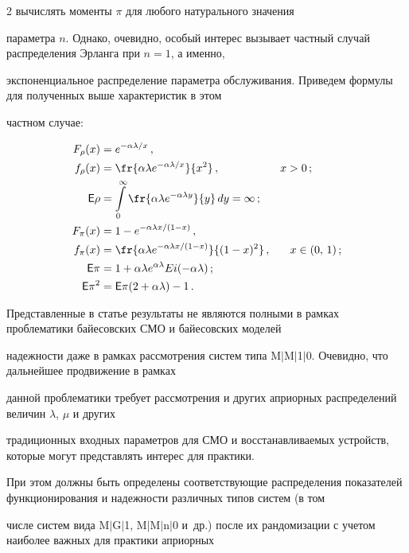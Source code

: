 \begin{multicols}{2}
вычис\-лять моменты $\pi$ для любого натурального значения


параметра $n$. Однако, очевидно, особый интерес вызывает частный случай распределения Эрланга при $n=1$, а именно,


экспоненциальное распределение параметра обслуживания. Приведем формулы для полученных выше характеристик в этом


частном случае:


\begin{align*}


F_\rho(x)&=e^{-\alpha\lambda /x}\,, \\ 


f_\rho(x)&=\fr{\alpha\lambda e^{-\alpha\lambda / x}} {x^2}\,,& x>0\,;\ \ \ \ \ \ \ \ \\


\e\rho  &=\il{0}{\infty}\fr{\alpha\lambda e^{-\alpha\lambda y}}{y}\, dy=\infty\,;\\ 


F_\pi(x) &=1-e^{-\alpha\lambda x /(1-x)}\,,\\


f_\pi(x)&=\fr{\alpha\lambda e^{-\alpha\lambda x /(1-x)}}{(1-x)^2}\,,& x\in(0,\,1)\,;\\


\e\pi &=1+\alpha\lambda e^{\alpha\lambda} Ei(-\alpha\lambda)\,;\\ 


\e\pi^2&=\e\pi(2+\alpha\lambda)-1\,.


\end{align*}





Представленные в статье результаты не являются полными в рамках проблематики байесовских СМО и байесовских моделей


надежности даже в рамках рассмотрения систем типа M$\vert$M$\vert$1$\vert$0. Очевидно, что дальнейшее продвижение в рамках


данной проблематики требует рассмотрения и других априорных распределений величин $\lambda$, $\mu$ и других


традиционных входных параметров для СМО и восстанавливаемых устройств, которые могут представлять интерес для практики.


При этом должны быть определены соответствующие распределения показателей функционирования и надежности различных типов систем (в том


числе систем вида M$\vert$G$\vert$1, M$\vert$M$\vert$n$\vert$0 и~др.) после их рандомизации с учетом наиболее важных для практики априорных



\end{multicols}
